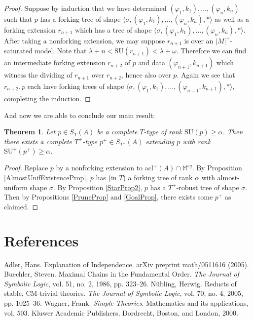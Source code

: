 \documentclass{article}
\newtheorem{theorem}{Theorem}[section]
\theoremstyle{remark}
\theoremstyle{definition}
\begin{document}
\begin{proof}
    Suppose by induction that we have determined $(\varphi_1,k_1),\dots,(\varphi_n,k_n)$ such that $p$ has a forking tree of shape $\langle \sigma, (\varphi_1,k_1),\dots,(\varphi_n,k_n),*\rangle$ as well as a forking extension $r_{n+1}$ which has a tree of shape $\langle \sigma, (\varphi_1,k_1),\dots,(\varphi_n,k_n),*\rangle$. After taking a nonforking extension, we may suppose $r_{n+1}$ is over an $|M|^+$-saturated model. Note that $\lambda+n<\mathrm{SU}(r_{n+1})<\lambda+\omega$. Therefore we can find an intermediate forking extension $r_{n+2}$ of $p$ and data $(\varphi_{n+1},k_{n+1})$ which witness the dividing of $r_{n+1}$ over $r_{n+2}$, hence also over $p$. Again we see that $r_{n+2},p$ each have forking trees of shape $\langle \sigma, (\varphi_{1},k_{1}),\dots,(\varphi_{n+1},k_{n+1}),*\rangle$, completing the induction.
\end{proof}

And now we are able to conclude our main result:
\begin{theorem}\label{FullThm}
    Let $p\in S_T(A)$ be a complete $T$-type of rank $\mathrm{SU}(p)\geq\alpha$. Then there exists a complete $T^+$-type $p^+\in S_{T^+}(A)$ extending $p$ with rank $\mathrm{SU}^+(p^+)\geq \alpha$.
\end{theorem}
\begin{proof}
    Replace $p$ by a nonforking extension to $\mathrm{acl}^+(A)\cap\mathbb{M}^{eq}$. By Proposition \ref{AlmostUnifExistenceProp}, $p$ has (in $T$) a forking tree of rank $\alpha$ with almost-uniform shape $\sigma$. By Proposition \ref{StarProp2}, $p$ has a $T^+$-robust tree of shape $\sigma$. Then by Propositions \ref{PruneProp} and \ref{GoalProp}, there exists some $p^+$ as claimed.
\end{proof}





\section{References}
\noindent[A] Adler, Hans. Explanation of Independence. arXiv preprint math/0511616 (2005).
\newline
\newline
\noindent[B] Buechler, Steven. Maximal Chains in the Fundamental Order. \textit{The Journal of Symbolic Logic}, vol. 51, no. 2, 1986, pp. 323–26.
\newline
\newline
\noindent[N] N\"ubling, Herwig. Reducts of stable, CM-trivial theories. \textit{The Journal of Symbolic Logic}, vol. 70, no. 4, 2005, pp. 1025–36.
\newline
\newline
\noindent[W] Wagner, Frank. \textit{Simple Theories}. Mathematics and its applications, vol. 503.
Kluwer Academic Publishers, Dordrecht, Boston, and London, 2000.
\end{document}
